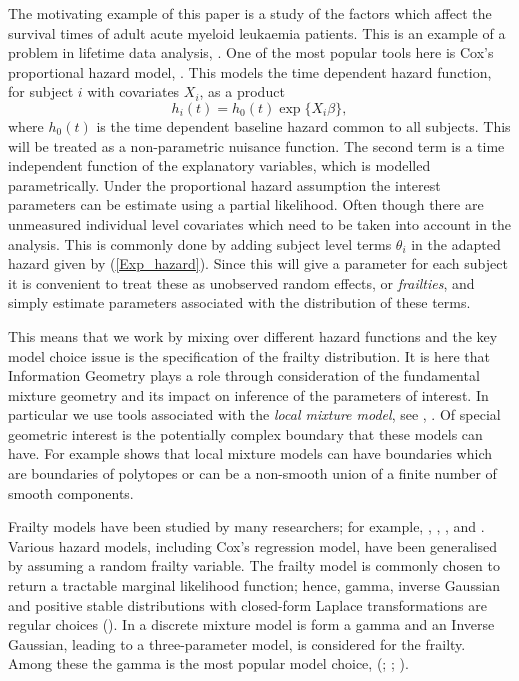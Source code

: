 \documentclass[graybox]{svmult}
\begin{document}
The motivating example of this paper is a study of the factors which affect the survival times of adult acute myeloid leukaemia patients. This is an example of a problem in lifetime data analysis, \cite{Lawless1981}. One of the most popular tools here is  Cox's proportional hazard model, \cite{Cox1972}. This models the time dependent hazard function, for subject $i$ with covariates $X_i$, as a product
$$
h_i(t) = h_0(t) \exp\{X_i\beta \},
$$ where $h_0(t)$ is the time dependent baseline hazard common to all subjects. This will be treated as a non-parametric nuisance function. The second term is a time independent  function of the explanatory variables, which is modelled parametrically. Under the proportional hazard  assumption the interest parameters can be estimate using a partial likelihood. Often though there are unmeasured individual level covariates which need to be taken into account in the analysis. This is commonly done by adding  subject level  terms $\theta_i$ in the adapted hazard given by (\ref{Exp_hazard}). Since this will give a parameter for each subject it is convenient to treat these as unobserved  random effects, or {\em  frailties}, and simply estimate parameters associated with the distribution of these terms. 

This  means that we work by mixing over different hazard functions and the key  model choice issue is the specification of the frailty distribution.  It is  here that Information Geometry plays a role through consideration of the fundamental mixture geometry  and its impact on  inference of the parameters of interest. In particular we use  tools associated with  the {\em local mixture model}, see  \cite{Marriott2002}, \cite{anaya2007local}. Of special geometric interest  is the potentially complex boundary that these models can have. For example   \cite{Maroufy2015} shows that local mixture models can have boundaries which are boundaries of  polytopes or  can be  a non-smooth union of a finite number of smooth components.




Frailty models have been studied by many researchers;
for example,  \cite{Clayton1978},  \cite{Hougaard1986a}, \cite{Klein1992}, and \cite{Gorfine2006}. 
Various hazard models, including Cox's regression model, have
been generalised by assuming a  random  frailty variable.  The frailty model is commonly chosen to return a tractable marginal likelihood
function; hence, gamma, inverse
Gaussian and positive stable distributions  with closed-form Laplace transformations
are regular choices (\cite[p.77]{Cook2007}). In \cite{Hougaard1995} a discrete mixture model is form a gamma and an Inverse Gaussian, leading to a three-parameter model, is considered for the frailty. Among these the gamma is the most popular model choice,  
(\cite{Klein1992}; \cite{Nielsen1992}; \cite{Vaupel1979}). 
\end{document}
